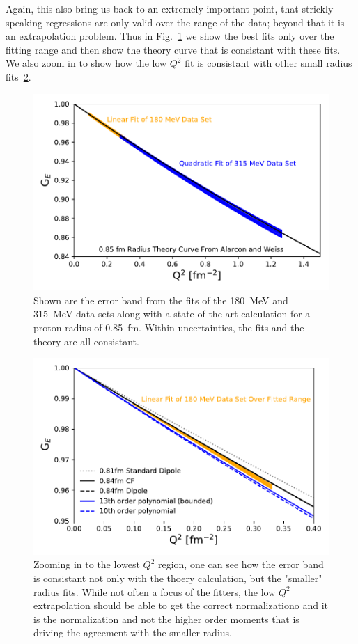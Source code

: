 \documentclass[10pt,aps,prc,twocolumn]{revtex4-1}
\begin{document}
Again, this also bring us back to an extremely important point, that strickly speaking regressions are only 
valid over the range of the data; beyond that it is an extrapolation problem.
Thus in Fig.~\ref{FitsAndTheory} we show the best fits only over the fitting range and then show the theory
curve that is consistant with these fits.   We also zoom in to show how the low $Q^2$ fit is consistant with
other small radius fits~\ref{FitsAndOtherFits}.

\begin{figure}[htb]
\includegraphics[width=\columnwidth]{Figure/FitsAndTheory.pdf}
\caption{Shown are the error band from the fits of the 180~MeV and 315~MeV data sets along with a state-of-the-art
calculation for a proton radius of 0.85~fm.   Within uncertainties, the fits and the theory are all consistant.}
\label{FitsAndTheory}
\end{figure}

\begin{figure}[htb]
\includegraphics[width=\columnwidth]{Figure/FitsAndTheoryLowest.pdf}
\caption{Zooming in to the lowest $Q^2$ region, one can see how the error band is consistant not only with the
thoery calculation, but the "smaller" radius fits.   While not often a focus of the fitters, the low $Q^2$ 
extrapolation should be able to get the correct normalizationo and it is the normalization and not the higher
order moments that is driving the agreement with the smaller radius.}
\label{FitsAndOtherFits}
\end{figure}
\end{document}
